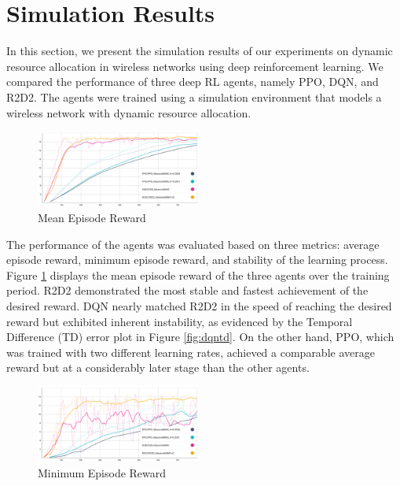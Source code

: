 \documentclass[conference]{IEEEtran}
\begin{document}
\section{Simulation Results}
In this section, we present the simulation results of our experiments on dynamic resource allocation in wireless networks using deep reinforcement learning. We compared the performance of three deep RL agents, namely PPO, DQN, and R2D2. The agents were trained using a simulation environment that models a wireless network with dynamic resource allocation.

\begin{figure}[b!]
    \centering
    \includegraphics[width=0.48\textwidth, height=0.25\textwidth]{figures/Mean_Reward.png}
    \caption{Mean Episode Reward}
    \label{fig:meanr}
\end{figure}

The performance of the agents was evaluated based on three metrics: average episode reward, minimum episode reward, and stability of the learning process. Figure \ref{fig:meanr} displays the mean episode reward of the three agents over the training period. R2D2 demonstrated the most stable and fastest achievement of the desired reward. DQN nearly matched R2D2 in the speed of reaching the desired reward but exhibited inherent instability, as evidenced by the Temporal Difference (TD) error plot in Figure \ref{fig:dqntd}. On the other hand, PPO, which was trained with two different learning rates, achieved a comparable average reward but at a considerably later stage than the other agents.

\begin{figure}[t!]
    \centering
    \includegraphics[width=0.48\textwidth, height=0.25\textwidth]{figures/Min_Reward.png}
    \caption{Minimum Episode Reward}
    \label{fig:minr}
\end{figure}
\end{document}
